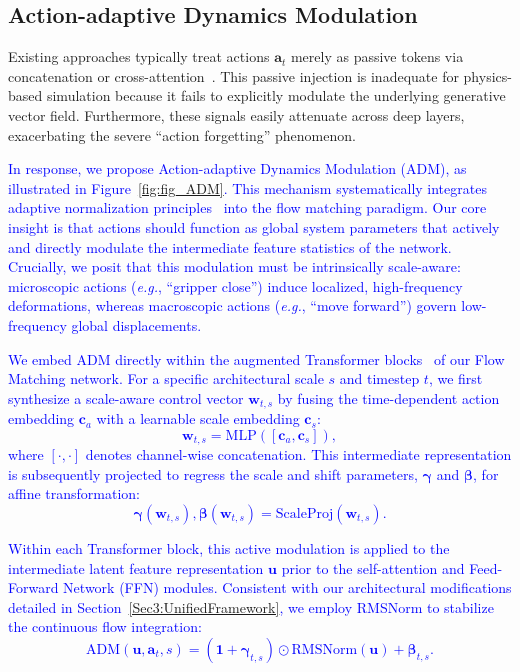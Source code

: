 \subsection{Action-adaptive Dynamics Modulation}
\label{Sec3:ActionModulation}
Existing approaches typically treat actions $\boldsymbol{a}_t$ merely as passive tokens via concatenation or cross-attention~\cite{mou2024t2i, wang2025sampo}. This passive injection is inadequate for physics-based simulation because it fails to explicitly modulate the underlying generative vector field. Furthermore, these signals easily attenuate across deep layers, exacerbating the severe ``action forgetting'' phenomenon.

\textcolor{blue}{In response, we propose Action-adaptive Dynamics Modulation (ADM), as illustrated in Figure~\ref{fig:fig_ADM}. This mechanism systematically integrates adaptive normalization principles~\cite{karras2019stylegan2, park2019semantic, yu2025pixeldit} into the flow matching paradigm. Our core insight is that actions should function as global system parameters that actively and directly modulate the intermediate feature statistics of the network. Crucially, we posit that this modulation must be intrinsically scale-aware: microscopic actions (\textit{e.g.}, ``gripper close'') induce localized, high-frequency deformations, whereas macroscopic actions (\textit{e.g.}, ``move forward'') govern low-frequency global displacements.}

\textcolor{blue}{We embed ADM directly within the augmented Transformer blocks~\cite{yao2025reconstruction} of our Flow Matching network. For a specific architectural scale $s$ and timestep $t$, we first synthesize a scale-aware control vector $\boldsymbol{w}_{t,s}$ by fusing the time-dependent action embedding $\boldsymbol{c}_a$ with a learnable scale embedding $\boldsymbol{c}_s$:
\begin{equation}
    \boldsymbol{w}_{t,s} = \text{MLP}([ \boldsymbol{c}_a, \boldsymbol{c}_s ]),
\end{equation}
where $[\cdot, \cdot]$ denotes channel-wise concatenation. This intermediate representation is subsequently projected to regress the scale and shift parameters, $\boldsymbol{\gamma}$ and $\boldsymbol{\beta}$, for affine transformation:
\begin{equation}
    \boldsymbol{\gamma}(\boldsymbol{w}_{t,s}), \boldsymbol{\beta}(\boldsymbol{w}_{t,s}) = \text{ScaleProj}(\boldsymbol{w}_{t,s}).
\end{equation}}

\textcolor{blue}{Within each Transformer block, this active modulation is applied to the intermediate latent feature representation $\boldsymbol{u}$ prior to the self-attention and Feed-Forward Network (FFN) modules. Consistent with our architectural modifications detailed in Section~\ref{Sec3:UnifiedFramework}, we employ RMSNorm to stabilize the continuous flow integration:
\begin{equation}
    \text{ADM}(\boldsymbol{u}, \boldsymbol{a}_t, s) = (\boldsymbol{1} + \boldsymbol{\gamma}_{t,s}) \odot \text{RMSNorm}(\boldsymbol{u}) + \boldsymbol{\beta}_{t,s}.
\end{equation}}

